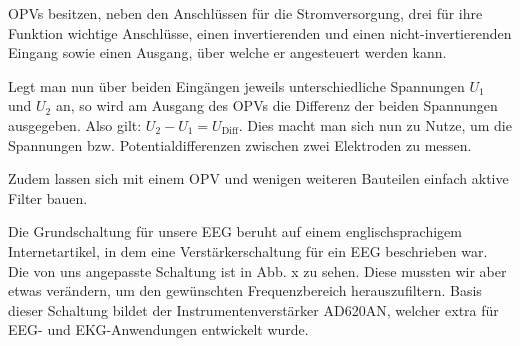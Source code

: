 \documentclass[10pt]{article}
\begin{document}
OPVs besitzen, neben den Anschlüssen für die Stromversorgung, drei für ihre Funktion wichtige Anschlüsse, einen invertierenden und einen nicht-invertierenden Eingang sowie einen Ausgang, über welche er angesteuert werden kann.

Legt man nun über beiden Eingängen jeweils unterschiedliche Spannungen $U_{1}$ und $U_{2}$ an, so wird am Ausgang des OPVs die Differenz der beiden Spannungen ausgegeben. Also gilt: $U_{2} - U_{1} = U_{\textrm{Diff}}$. 
Dies macht man sich nun zu Nutze, um die Spannungen bzw. Potentialdifferenzen zwischen zwei Elektroden zu messen. 

Zudem lassen sich mit einem OPV und wenigen weiteren Bauteilen einfach aktive Filter bauen.

Die Grundschaltung für unsere EEG beruht auf einem englischsprachigem Internetartikel, in dem eine Verstärkerschaltung für ein EEG beschrieben war. Die von uns angepasste Schaltung ist in Abb. x zu sehen.
Diese mussten wir aber etwas verändern, um den gewünschten Frequenzbereich herauszufiltern.
Basis dieser Schaltung bildet der Instrumentenverstärker AD620AN, welcher extra für EEG- und EKG-Anwendungen entwickelt wurde.
\end{document}
